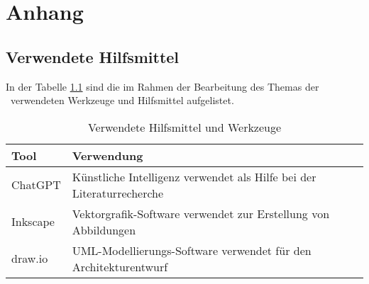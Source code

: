%

\chapter{Anhang}

\section{Verwendete Hilfsmittel}
In der Tabelle \ref{tab:tooling} sind die im Rahmen der Bearbeitung des Themas der \IthesisKindDE~verwendeten Werkzeuge und Hilfsmittel aufgelistet.

\begin{table}[h!]
\caption{Verwendete Hilfsmittel und Werkzeuge}
\begin{tabular}{|l|l|}
\hline 
\rowcolor{lightgray} Tool & Verwendung \\
\hline
ChatGPT & Künstliche Intelligenz verwendet als Hilfe bei der Literaturrecherche \\
\hline
Inkscape & Vektorgrafik-Software verwendet zur Erstellung von Abbildungen \\
\hline
draw.io & UML-Modellierungs-Software verwendet für den Architekturentwurf \\
\hline
\end{tabular}
\label{tab:tooling}
\end{table}
